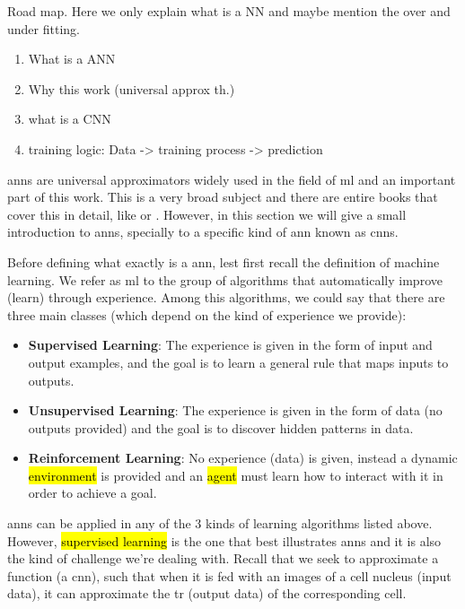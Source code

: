 
\glsresetall

\graphicspath{{./Sections/Basics/Resources/}}

Road map. Here we only explain what is a NN and maybe mention the over and under fitting.
\begin{enumerate}
  \item What is a ANN
  \item Why this work (universal approx th.)
  \item what is a CNN
  \item training logic: Data -> training process -> prediction
\end{enumerate}

\glspl{ann} are universal approximators widely used in the field of \gls{ml} and an important part of this work. This is a very broad subject and there are entire books that cover this in detail, like  \cite{Goodfellow-et-al-2016} or \cite{bishop2006pattern}. However, in this section we will give a small introduction to \glspl{ann}, specially to a specific kind of \gls{ann} known as \glspl{cnn}.

Before defining what exactly is a \gls{ann}, lest first recall the definition of machine learning. We refer as \gls{ml} to the group of algorithms that automatically improve (learn) through experience. Among this algorithms, we could say that there are three main classes (which depend on the kind of experience we provide):

\begin{itemize}
  \item \textbf{Supervised Learning}: The experience is given in the form of input and output examples, and the goal is to learn a general rule that maps inputs to outputs.
  \item \textbf{Unsupervised Learning}: The experience is given in the form of data (no outputs provided) and the goal is to discover hidden patterns in data.
  \item \textbf{Reinforcement Learning}: No experience (data) is given, instead a dynamic \hl{environment} is provided and an \hl{agent} must learn how to interact with it in order to achieve a goal.
\end{itemize}

\glspl{ann} can be applied in any of the 3 kinds of learning algorithms listed above. However, \hl{supervised learning} is the one that best illustrates \glspl{ann} and it is also the kind of challenge we're dealing with. Recall that we seek to approximate a function (a \gls{cnn}), such that when it is fed with an images of a cell nucleus (input data), it can approximate the \gls{tr} (output data) of the corresponding cell.
